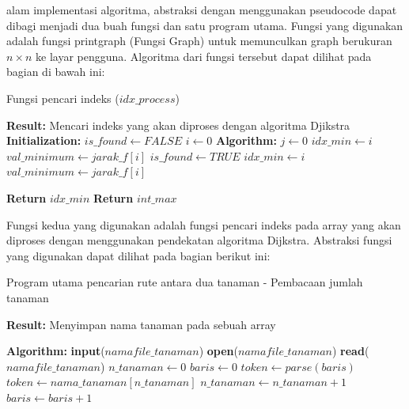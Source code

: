 \documentclass[conference]{IEEEtran}
\begin{document}
    alam implementasi algoritma, abstraksi dengan menggunakan pseudocode dapat dibagi menjadi dua buah fungsi dan
    satu program utama. Fungsi yang digunakan adalah fungsi
    printgraph (Fungsi Graph) untuk memunculkan graph berukuran $n \times n$ ke layar pengguna. Algoritma dari fungsi tersebut
    dapat dilihat pada bagian di bawah ini:

\begin{algorithm}[H]
    \caption{Fungsi pencari indeks ($idx\_process$)}\label{alg:idx_process}
\begin{algorithmic}
    \State \textbf{Result:} Mencari indeks yang akan diproses dengan algoritma Djikstra
    \State \textbf{Initialization:}
    \State $is\_found \leftarrow FALSE$
    \State  $i \leftarrow 0$
    \State \textbf{Algorithm:}
        \State $j \leftarrow 0$
            \State $idx\_min \leftarrow i$
            \State $val\_minimum \leftarrow jarak\_f[i]$
            \State $is\_found \leftarrow TRUE$
        \EndIf
            \State $idx\_min \leftarrow i$
            \State $val\_minimum \leftarrow jarak\_f[i]$
        \EndIf
    \EndWhile

        \State \textbf{Return} $idx\_min$
    \Else
        \State \textbf{Return} $int\_max$
    \EndIf

\end{algorithmic}
\end{algorithm}

    Fungsi kedua yang digunakan adalah fungsi pencari indeks
    pada array yang akan diproses dengan menggunakan pendekatan algoritma Dijkstra. Abstraksi fungsi yang digunakan
    dapat dilihat pada bagian berikut ini:

\begin{algorithm}[H]
    \caption{Program utama pencarian rute antara dua tanaman - Pembacaan jumlah tanaman}\label{alg:bacajumlahtanaman}
\begin{algorithmic}
    \State \textbf{Result:} Menyimpan nama tanaman pada sebuah array

    \State \textbf{Algorithm:}
    \State \textbf{input}($namafile\_tanaman$)
    \State \textbf{open}($namafile\_tanaman$)
    \State \textbf{read}($namafile\_tanaman$)
    \State $n\_tanaman \leftarrow 0$
    \State $baris \leftarrow 0$
        \State $token \leftarrow parse(baris)$
        \State $token \leftarrow nama\_tanaman[n\_tanaman]$
        \State $n\_tanaman \leftarrow n\_tanaman + 1$
        \State $baris \leftarrow baris + 1$
    \EndWhile
\end{algorithmic}
\end{algorithm}
\end{document}
